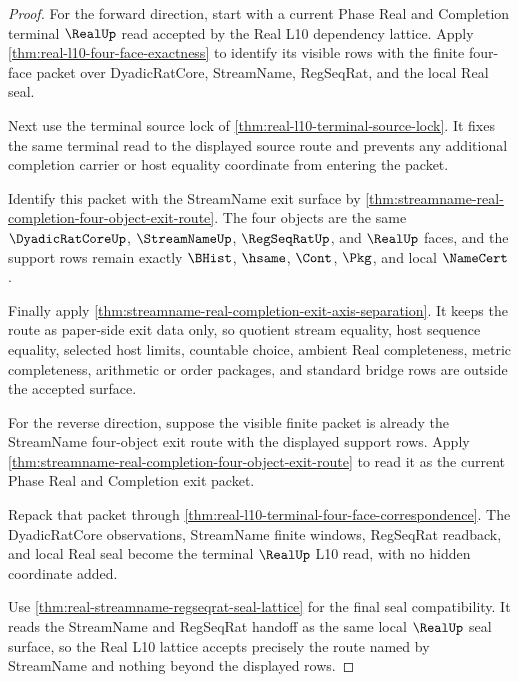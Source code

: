 \begin{proof}
For the forward direction, start with a current Phase Real and Completion terminal $\RealUp$ read accepted by the Real L10 dependency lattice. Apply \autoref{thm:real-l10-four-face-exactness} to identify its visible rows with the finite four-face packet over DyadicRatCore, StreamName, RegSeqRat, and the local Real seal.

Next use the terminal source lock of \autoref{thm:real-l10-terminal-source-lock}. It fixes the same terminal read to the displayed source route and prevents any additional completion carrier or host equality coordinate from entering the packet.

Identify this packet with the StreamName exit surface by \autoref{thm:streamname-real-completion-four-object-exit-route}. The four objects are the same $\DyadicRatCoreUp$, $\StreamNameUp$, $\RegSeqRatUp$, and $\RealUp$ faces, and the support rows remain exactly $\BHist$, $\hsame$, $\Cont$, $\Pkg$, and local $\NameCert$.

Finally apply \autoref{thm:streamname-real-completion-exit-axis-separation}. It keeps the route as paper-side exit data only, so quotient stream equality, host sequence equality, selected host limits, countable choice, ambient Real completeness, metric completeness, arithmetic or order packages, and standard bridge rows are outside the accepted surface.

For the reverse direction, suppose the visible finite packet is already the StreamName four-object exit route with the displayed support rows. Apply \autoref{thm:streamname-real-completion-four-object-exit-route} to read it as the current Phase Real and Completion exit packet.

Repack that packet through \autoref{thm:real-l10-terminal-four-face-correspondence}. The DyadicRatCore observations, StreamName finite windows, RegSeqRat readback, and local Real seal become the terminal $\RealUp$ L10 read, with no hidden coordinate added.

Use \autoref{thm:real-streamname-regseqrat-seal-lattice} for the final seal compatibility. It reads the StreamName and RegSeqRat handoff as the same local $\RealUp$ seal surface, so the Real L10 lattice accepts precisely the route named by StreamName and nothing beyond the displayed rows.
\end{proof}

